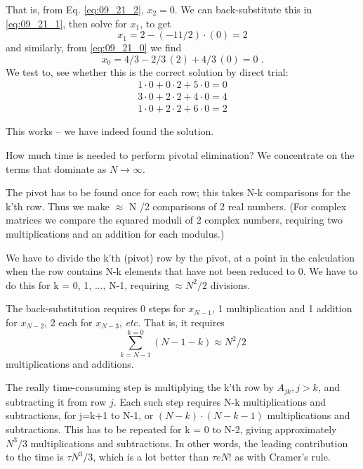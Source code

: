 That is, from Eq. \ref{eq:09_21_2}, $x_2 = 0$. We can back-substitute this in  \ref{eq:09_21_1},
then solve for $x_1$, to get
\begin{equation*}
    x_1 = 2 - (-11/2)\cdot(0) = 2
\end{equation*} 
and similarly, from \ref{eq:09_21_0} we find
\begin{equation*}
x_0 = 4/3 - 2/3\,(2)+4/3\,(0) = 0 \; .
\end{equation*} 
We test to, see whether this is the correct solution by direct trial:
\begin{align*}
1 \cdot 0+0 \cdot 2+5 \cdot 0=0\\
3 \cdot 0+2 \cdot 2+4 \cdot 0=4\\
1 \cdot 0+2 \cdot 2+6 \cdot 0=2
\end{align*} 

This works -- we have indeed found the solution.

How much time is needed to perform pivotal elimination? We
concentrate on the terms that dominate as $N\to\infty$.

The pivot has to be found once for each row; this takes N-k
comparisons for the k'th row. Thus we make $\approx$ N /2 comparisons
of 2 real numbers. (For complex matrices we compare the
squared moduli of 2 complex numbers, requiring two multiplications and an addition for each modulus.)

We have to divide the k'th (pivot) row by the pivot, at a point in
the calculation when the row contains N-k elements that have not
been reduced to 0. We have to do this for k = 0, 1, ..., N-1, 
requiring $\approx N^2/2$ divisions.

The back-substitution requires 0 steps for $x_{N-1}$, 1 multiplication
and 1 addition for $x_{N-2}$, 2 each for $x_{N-3}$, \textit{etc.} That is, it requires
\begin{equation*}
    \sum_{k=N-1}^{k=0}(N-1-k) \approx N^2/2
\end{equation*} 
multiplications and additions.

The really time-consuming step is multiplying the k'th row by
$A_{jk}, j > k$, and subtracting it from row $j$. Each such step requires
N-k multiplications and subtractions, for j=k+1 to N-1, or
$(N -k) \cdot (N -k- 1)$ multiplications and subtractions. This has to be
repeated for k = 0 to N-2, giving approximately $N^3/3$ multiplications and subtractions. In other words, the leading contribution to the time is $\tau N^3/3$, which is a lot better than $\tau e N!$ as with
Cramer's rule.

